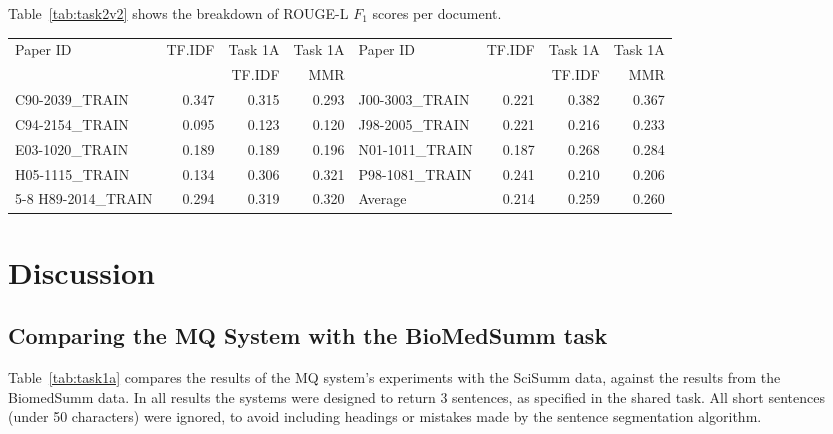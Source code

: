 \documentclass[11pt]{article}
\begin{document}
\noindent{}

Table~\ref{tab:task2v2} shows the breakdown of ROUGE-L $F_1$ scores per
document.

\begin{table*}
  \centering
  \begin{tabular}{|l|r|r|r||l|r|r|r|}
  \hline
	Paper ID & TF.IDF & Task 1A  & Task 1A & 	Paper ID & TF.IDF & Task 1A  & Task 1A  \\
			&	& TF.IDF & MMR & 	&	& TF.IDF & MMR \\
	\hline
	C90-2039\_TRAIN & 0.347 & 0.315 & 0.293 &	J00-3003\_TRAIN & 0.221 & 0.382 & 0.367\\
	C94-2154\_TRAIN & 0.095 & 0.123 & 0.120 & 	J98-2005\_TRAIN & 0.221 & 0.216 & 0.233\\
	E03-1020\_TRAIN & 0.189 & 0.189 & 0.196 &	N01-1011\_TRAIN & 0.187 & 0.268 & 0.284\\
	H05-1115\_TRAIN & 0.134 & 0.306 & 0.321 & 	P98-1081\_TRAIN & 0.241 & 0.210 & 0.206\\
\cline{5-8}
	H89-2014\_TRAIN & 0.294 & 0.319 & 0.320 &	Average & 0.214 & 0.259 & 0.260 \\
	\hline
  \end{tabular}
  \caption{ROUGE-L $F_1$ results for summaries generated by the MQ system.}
  \label{tab:task2v2}
\end{table*}

\section{Discussion}
\vspace{-.3cm}
\subsection{Comparing the MQ System with the BioMedSumm task}
Table~\ref{tab:task1a} compares the results of the MQ system's experiments with the SciSumm data, against the results from the BiomedSumm data. In all results the systems were designed to return 3 sentences, as specified in the shared task. All short sentences (under 50 characters) were ignored, to avoid including headings or mistakes made by the sentence segmentation algorithm.
\end{document}
